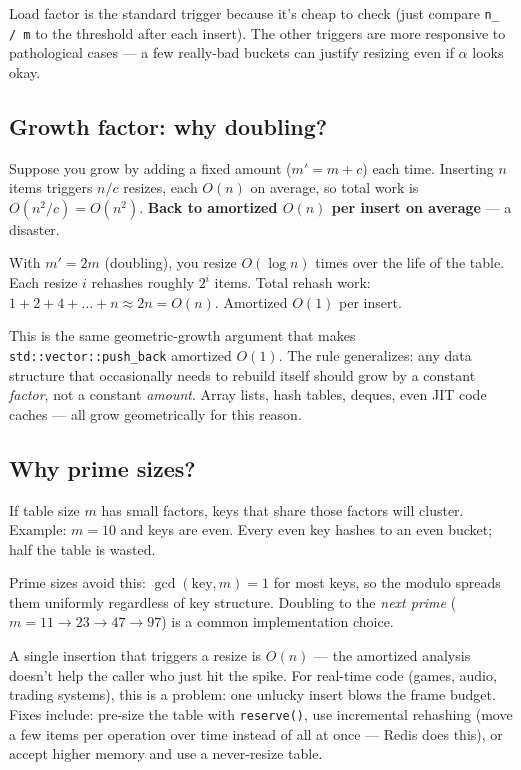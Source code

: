 \documentclass[11pt]{article}
\begin{document}
Load factor is the standard trigger because it's cheap to check
(just compare \texttt{n\_ / m} to the threshold after each
insert). The other triggers are more responsive to pathological
cases --- a few really-bad buckets can justify resizing even if
$\alpha$ looks okay.

\subsection*{Growth factor: why doubling?}

Suppose you grow by adding a fixed amount ($m' = m + c$) each
time. Inserting $n$ items triggers $n/c$ resizes, each $O(n)$ on
average, so total work is $O(n^2 / c) = O(n^2)$. \textbf{Back to
amortized $O(n)$ per insert on average} --- a disaster.

With $m' = 2m$ (doubling), you resize $O(\log n)$ times over the
life of the table. Each resize $i$ rehashes roughly $2^i$ items.
Total rehash work: $1 + 2 + 4 + \ldots + n \approx 2n = O(n)$.
Amortized $O(1)$ per insert.

\begin{ideabox}
This is the same geometric-growth argument that makes
\texttt{std::vector::push\_back} amortized $O(1)$. The rule
generalizes: any data structure that occasionally needs to
rebuild itself should grow by a constant \emph{factor}, not a
constant \emph{amount}. Array lists, hash tables, deques, even
JIT code caches --- all grow geometrically for this reason.
\end{ideabox}

\subsection*{Why prime sizes?}

If table size $m$ has small factors, keys that share those
factors will cluster. Example: $m = 10$ and keys are even. Every
even key hashes to an even bucket; half the table is wasted.

Prime sizes avoid this: $\gcd(\text{key}, m) = 1$ for most keys,
so the modulo spreads them uniformly regardless of key
structure. Doubling to the \emph{next prime} ($m = 11 \to 23 \to
47 \to 97$) is a common implementation choice.

\begin{warnbox}
A single insertion that triggers a resize is $O(n)$ --- the
amortized analysis doesn't help the caller who just hit the
spike. For real-time code (games, audio, trading systems), this
is a problem: one unlucky insert blows the frame budget. Fixes
include: pre-size the table with \texttt{reserve()}, use
incremental rehashing (move a few items per operation over time
instead of all at once --- Redis does this), or accept higher
memory and use a never-resize table.
\end{warnbox}
\end{document}

